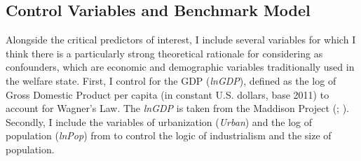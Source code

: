 \documentclass[11pt]{article}
\begin{document}

\subsection{Control Variables and Benchmark Model}

Alongside the critical predictors of interest, I include several variables for which I think there is a particularly strong theoretical rationale for considering as confounders, which are economic and demographic variables traditionally used in the welfare state.  First, I control for the GDP (\textit{lnGDP}), defined as the log of Gross Domestic Product per capita (in constant U.S. dollars, base 2011) to account for Wagner’s Law. The \textit{lnGDP} is taken from the Maddison Project (\citealp{Bolt2014}; \citealp[14]{Rasmussen2019}). Secondly, I include the variables of urbanization (\textit{Urban}) and the log of population (\textit{lnPop}) from \citet{Miller2015a} to control the logic of industrialism and the size of population. 


\par



\end{document}
